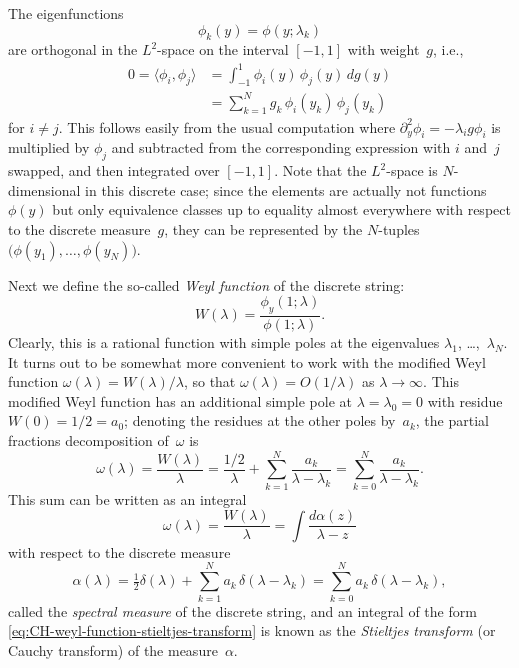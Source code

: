 \documentclass[10pt,a4paper]{article} \pdfoutput=1 
\begin{document}
The eigenfunctions
\begin{equation*}
  \phi_k(y) = \phi(y;\lambda_k)
\end{equation*}
are orthogonal in the $L^2$-space on the interval $[-1,1]$ with weight~$g$,
i.e.,
\begin{equation}
  \begin{split}
    0
    = \langle \phi_i, \phi_j \rangle
    &
    = \int_{-1}^1 \phi_i(y) \, \phi_j(y) \, dg(y)
    \\ &
    = \sum_{k=1}^N g_k \, \phi_i(y_k) \, \phi_j(y_k)
  \end{split}
\end{equation}
for $i \neq j$.
This follows easily from the usual computation where $\partial_y^2 \phi_i = -\lambda_i g \phi_i$
is multiplied by $\phi_j$ and subtracted from the corresponding expression with $i$ and~$j$ swapped,
and then integrated over $[-1,1]$.
Note that the $L^2$-space is $N$-dimensional in this discrete case;
since the elements are actually not functions $\phi(y)$ but only
equivalence classes up to equality almost everywhere with respect to the discrete measure~$g$,
they can be represented by the $N$-tuples $\bigl( \phi(y_1),\dots, \phi(y_N) \bigr)$.

Next we define the so-called \emph{Weyl function} of the discrete string:
\begin{equation}
  \label{eq:CH-weyl-function-def}
  W(\lambda) = \frac{\phi_y(1;\lambda)}{\phi(1;\lambda)}
  .
\end{equation}
Clearly, this is a rational function with simple poles at the eigenvalues
$\lambda_1$, \ldots,~$\lambda_N$.
It turns out to be somewhat more convenient to work with the modified Weyl function
$\omega(\lambda) = W(\lambda)/\lambda$,
so that $\omega(\lambda) = O(1/\lambda)$ as $\lambda \to \infty$.
This modified Weyl function has an additional simple pole
at $\lambda=\lambda_0=0$ with residue $W(0)=1/2=a_0$;
denoting the residues at the other poles by~$a_k$,
the partial fractions decomposition of~$\omega$ is
\begin{equation}
  \label{eq:CH-weyl-function-parfrac}
  \omega(\lambda)
  = \frac{W(\lambda)}{\lambda}
  = \frac{1/2}{\lambda} + \sum_{k=1}^N \frac{a_k}{\lambda - \lambda_k}
  = \sum_{k=0}^N \frac{a_k}{\lambda - \lambda_k}
  .
\end{equation}
This sum can be written as an integral
\begin{equation}
  \label{eq:CH-weyl-function-stieltjes-transform}
  \omega(\lambda)
  = \frac{W(\lambda)}{\lambda}
  = \int \frac{d\alpha(z)}{\lambda-z}
\end{equation}
with respect to the discrete measure
\begin{equation}
  \label{eq:CH-peakon-spectral-measure}
  \alpha(\lambda)
  = \tfrac12 \delta(\lambda) + \sum_{k=1}^N a_k \, \delta(\lambda-\lambda_k)
  = \sum_{k=0}^N a_k \, \delta(\lambda-\lambda_k)
  ,
\end{equation}
called the \emph{spectral measure} of the discrete string,
and an integral of the form \eqref{eq:CH-weyl-function-stieltjes-transform} is known as
the \emph{Stieltjes  transform} (or Cauchy transform) of the measure~$\alpha$.
\end{document}
